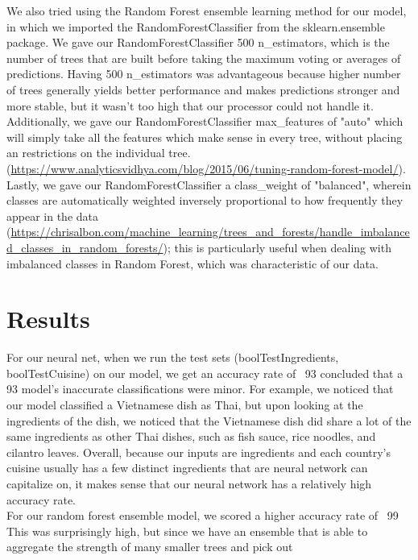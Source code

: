 \documentclass[11pt]{article}
\begin{document}

We also tried using the Random Forest ensemble learning method for our model,
in which we imported the RandomForestClassifier from the sklearn.ensemble package.
We gave our RandomForestClassifier 500 n\_estimators, which is the number of trees
that are built before taking the maximum voting or averages of predictions. Having
500 n\_estimators was advantageous because higher number of trees generally yields
better performance and makes predictions stronger and more stable, but it wasn't
too high that our processor could not handle it. Additionally, we gave our
RandomForestClassifier max\_features of "auto" which will simply take all the
features which make sense in every tree, without placing an restrictions on
the individual tree. (\url{https://www.analyticsvidhya.com/blog/2015/06/tuning-random-forest-model/}).
Lastly, we gave our RandomForestClassifier a class\_weight of "balanced", wherein
classes are automatically weighted inversely proportional to how frequently they
appear in the data (\url{https://chrisalbon.com/machine_learning/trees_and_forests/handle_imbalanced_classes_in_random_forests/});
this is particularly useful when dealing with imbalanced classes in Random Forest,
which was characteristic of our data.

\section{Results}

For our neural net, when we run the test sets (boolTestIngredients, boolTestCuisine)
on our model, we get an accuracy rate of ~93%
concluded that a 93%
model's inaccurate classifications were minor. For example, we noticed that
our model classified a Vietnamese dish as Thai, but upon looking at the ingredients
of the dish, we noticed that the Vietnamese dish did share a lot of the same
ingredients as other Thai dishes, such as fish sauce, rice noodles, and cilantro
leaves. Overall, because our inputs are ingredients and each country's cuisine usually
has a few distinct ingredients that are neural network can capitalize on,
it makes sense that our neural network has a relatively high accuracy rate. \\

For our random forest ensemble model, we scored a higher accuracy rate of ~99%
This was surprisingly high, but since we have an ensemble that is able to aggregate
the strength of many smaller trees and pick out
\end{document}
